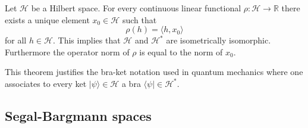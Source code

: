 	\begin{theorem}
    		Let $\mathcal{H}$ be a Hilbert space. For every continuous linear functional $\rho:\mathcal{H}\rightarrow\mathbb{R}$ there exists a unique element $x_0\in\mathcal{H}$ such that
    		\begin{equation}
	    		\rho(h) = \langle h, x_0 \rangle
    		\end{equation}
	    	for all $h\in\mathcal{H}$. This implies that $\mathcal{H}$ and $\mathcal{H}^*$ are isometrically isomorphic. Furthermore the operator norm of $\rho$ is equal to the norm of $x_0$.
	\end{theorem}
	\begin{remark}
    		This theorem justifies the bra-ket notation used in quantum mechanics where one associates to every ket $|\psi\rangle\in\mathcal{H}$ a bra $\langle\psi|\in\mathcal{H}^*$.
	\end{remark}
	
\subsection{Segal-Bargmann spaces}

	
